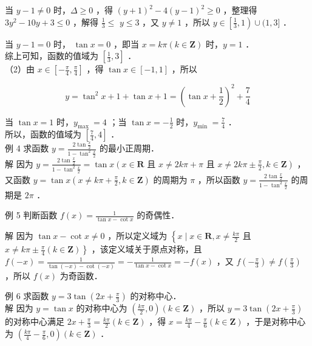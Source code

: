 \documentclass[10pt]{article}
\begin{document}
当 \(y-1 \neq 0\) 时，\(\Delta \geqslant 0\) ，得 \((y+1)^{2}-4(y-1)^{2} \geqslant 0\) ，整理得 \(3 y^{2}-10 y+3 \leqslant 0\) ，解得 \(\frac{1}{3} \leqslant\) \(y \leqslant 3\) ，又 \(y \neq 1\) ，所以 \(y \in\left[\frac{1}{3}, 1\right) \cup(1,3]\) ．

当 \(y-1=0\) 时， \(\tan x=0\) ，即当 \(x=k \pi(k \in \mathbf{Z})\) 时，\(y=1\) ．\\
综上可知，函数的值域为 \(\left[\frac{1}{3}, 3\right]\) ．\\
（2）由 \(x \in\left[-\frac{\pi}{4}, \frac{\pi}{4}\right]\) ，得 \(\tan x \in[-1,1]\) ，所以

\[
y=\tan ^{2} x+1+\tan x+1=\left(\tan x+\frac{1}{2}\right)^{2}+\frac{7}{4}
\]

当 \(\tan x=1\) 时，\(y_{\text {max }}=4\) ；当 \(\tan x=-\frac{1}{2}\) 时，\(y_{\text {min }}=\frac{7}{4}\) ．\\
所以，函数的值域为 \(\left[\frac{7}{4}, 4\right]\) ．\\
例 4 求函数 \(y=\frac{2 \tan \frac{x}{2}}{1-\tan ^{2} \frac{x}{2}}\) 的最小正周期．\\
解 因为 \(y=\frac{2 \tan \frac{x}{2}}{1-\tan ^{2} \frac{x}{2}}=\tan x\left(x \in \mathbf{R}\right.\) 且 \(x \neq 2 k \pi+\pi\) 且 \(\left.x \neq 2 k \pi \pm \frac{\pi}{2}, k \in \mathbf{Z}\right)\) ，又函数 \(y=\tan x\left(x \neq k \pi+\frac{\pi}{2}, k \in \mathbf{Z}\right)\) 的周期为 \(\pi\) ，所以函数 \(y=\frac{2 \tan \frac{x}{2}}{1-\tan ^{2} \frac{x}{2}}\) 的周期是 \(2 \pi\) ．

例 5 判断函数 \(f(x)=\frac{1}{\tan x-\cot x}\) 的奇偶性．

解 因为 \(\tan x-\cot x \neq 0\) ，所以定义域为 \(\left\{x \mid x \in \mathbf{R}, x \neq \frac{k \pi}{2}\right.\) 且 \(\left.x \neq k \pi \pm \frac{\pi}{4}(k \in \mathbf{Z})\right\}\) ，该定义域关于原点对称，且 \(f(-x)=\frac{1}{\tan (-x)-\cot (-x)}=-\frac{1}{\tan x-\cot x}=-f(x)\) ，又 \(f\left(-\frac{\pi}{3}\right) \neq f\left(\frac{\pi}{3}\right)\) ，所以 \(f(x)\) 为奇函数．

例 6 求函数 \(y=3 \tan \left(2 x+\frac{\pi}{3}\right)\) 的对称中心．\\
解 因为 \(y=\tan x\) 的对称中心为 \(\left(\frac{k \pi}{2}, 0\right)(k \in \mathbf{Z})\) ，所以 \(y=3 \tan \left(2 x+\frac{\pi}{3}\right)\) 的对称中心满足 \(2 x+\frac{\pi}{3}=\frac{k \pi}{2}(k \in \mathbf{Z})\) ，得 \(x=\frac{k \pi}{4}-\frac{\pi}{6}(k \in \mathbf{Z})\) ，于是对称中心为 \(\left(\frac{k \pi}{4}-\frac{\pi}{6}, 0\right)(k \in \mathbf{Z})\) ．
\end{document}
